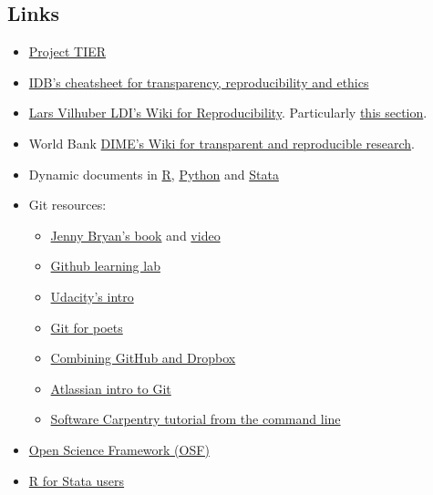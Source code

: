 \documentclass[]{book}
\providecommand{\tightlist}{%
  \setlength{\itemsep}{0pt}\setlength{\parskip}{0pt}}
\begin{document}
\hypertarget{links}{%
\subsection{Links}\label{links}}

\begin{itemize}
\tightlist
\item
  \href{https://www.projecttier.org/tier-protocol/}{Project TIER}\\
\item
  \href{http://idbdocs.iadb.org/wsdocs/getdocument.aspx?docnum=EZSHARE-1350314980-383}{IDB's cheatsheet for transparency, reproducibility and ethics}\\
\item
  \href{https://github.com/labordynamicsinstitute/replicability-training/wiki}{Lars Vilhuber LDI's Wiki for Reproducibility}. Particularly \href{https://github.com/labordynamicsinstitute/replicability-training/wiki/Prepare_and_run_replication}{this section}.\\
\item
  World Bank \href{https://dimewiki.worldbank.org/wiki/Main_Page}{DIME's Wiki for transparent and reproducible research}.
\item
  Dynamic documents in \href{https://rmarkdown.rstudio.com/gallery.html}{R}, \href{https://github.com/jupyter/jupyter/wiki/A-gallery-of-interesting-Jupyter-Notebooks\#economics-and-finance}{Python} and \href{https://github.com/BITSS/CEGA2019/blob/master/03-extra_dynamic_docs/02b-Stata-markdown/Stata\%20Markdown.pdf}{Stata}\\
\item
  Git resources:

  \begin{itemize}
  \tightlist
  \item
    \href{https://happygitwithr.com}{Jenny Bryan's book} and \href{https://www.rstudio.com/resources/videos/happy-git-and-gihub-for-the-user-tutorial/}{video}\\
  \item
    \href{https://lab.github.com/}{Github learning lab}
  \item
    \href{https://www.udacity.com/course/how-to-use-git-and-github--ud775}{Udacity's intro}\\
  \item
    \href{https://www.youtube.com/playlist?list=PLRqwX-V7Uu6ZF9C0YMKuns9sLDzK6zoiV}{Git for poets}\\
  \item
    \href{https://github.com/kbjarkefur/GitHubDropBox}{Combining GitHub and Dropbox}\\
  \item
    \href{https://www.atlassian.com/git/tutorials}{Atlassian intro to Git}
  \item
    \href{https://swcarpentry.github.io/git-novice/}{Software Carpentry tutorial from the command line}
  \end{itemize}
\item
  \href{https://osf.io}{Open Science Framework (OSF)}
\item
  \href{https://github.com/hblackburn/R4Econ/blob/master/Resources.md}{R for Stata users}
\end{itemize}
\end{document}
